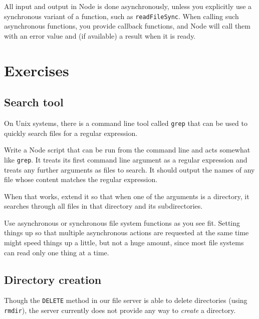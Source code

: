 All input and output in Node is done asynchronously, unless you explicitly use a synchronous variant of a function, such as \lstinline`readFileSync`. When calling such asynchronous functions, you provide callback functions, and Node will call them with an error value and (if available) a result when it is ready.

\section{Exercises}

\subsection{Search tool}

On Unix systems, there is a command line tool called \lstinline`grep` that can be used to quickly search files for a regular expression.

Write a Node script that can be run from the command line and acts somewhat like \lstinline`grep`. It treats its first command line argument as a regular expression and treats any further arguments as files to search. It should output the names of any file whose content matches the regular expression.

When that works, extend it so that when one of the arguments is a directory, it searches through all files in that directory and its subdirectories.

Use asynchronous or synchronous file system functions as you see fit. Setting things up so that multiple asynchronous actions are requested at the same time might speed things up a little, but not a huge amount, since most file systems can read only one thing at a time.

\subsection{Directory creation}

Though the \lstinline`DELETE` method in our file server is able to delete directories (using \lstinline`rmdir`), the server currently does not provide any way to \emph{create} a directory.

